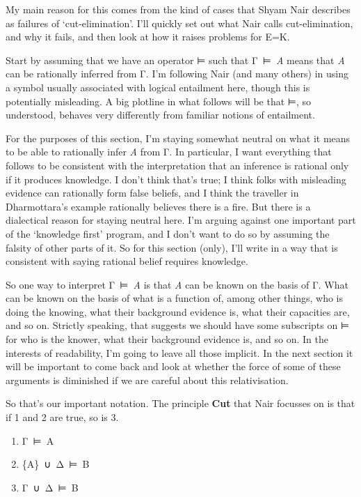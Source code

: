 \documentclass[
  11pt,
]{book}
\providecommand{\tightlist}{%
  \setlength{\itemsep}{0pt}\setlength{\parskip}{0pt}}
\begin{document}
My main reason for this comes from the kind of cases that Shyam Nair \citeyearpar{Nair2019} describes as failures of `cut-elimination'. I'll quickly set out what Nair calls cut-elimination, and why it fails, and then look at how it raises problems for E=K.

Start by assuming that we have an operator ⊨ such that Γ~⊨~\emph{A} means that \emph{A} can be rationally inferred from Γ. I'm following Nair (and many others) in using a symbol usually associated with logical entailment here, though this is potentially misleading. A big plotline in what follows will be that ⊨, so understood, behaves very differently from familiar notions of entailment.

For the purposes of this section, I'm staying somewhat neutral on what it means to be able to rationally infer \emph{A} from Γ. In particular, I want everything that follows to be consistent with the interpretation that an inference is rational only if it produces knowledge. I don't think that's true; I think folks with misleading evidence can rationally form false beliefs, and I think the traveller in Dharmottara's example rationally believes there is a fire. But there is a dialectical reason for staying neutral here. I'm arguing against one important part of the `knowledge first' program, and I don't want to do so by assuming the falsity of other parts of it. So for this section (only), I'll write in a way that is consistent with saying rational belief requires knowledge.

So one way to interpret Γ~⊨~\emph{A} is that \emph{A} can be known on the basis of Γ. What can be known on the basis of what is a function of, among other things, who is doing the knowing, what their background evidence is, what their capacities are, and so on. Strictly speaking, that suggests we should have some subscripts on ⊨ for who is the knower, what their background evidence is, and so on. In the interests of readability, I'm going to leave all those implicit. In the next section it will be important to come back and look at whether the force of some of these arguments is diminished if we are careful about this relativisation.

So that's our important notation. The principle \textbf{Cut} that Nair focusses on is that if 1 and 2 are true, so is 3.

\begin{enumerate}
\def\labelenumi{\arabic{enumi}.}
\tightlist
\item
  Γ~⊨~A
\item
  \{A\}~∪~Δ~⊨~B
\item
  Γ~∪~Δ~⊨~B
\end{enumerate}
\end{document}
